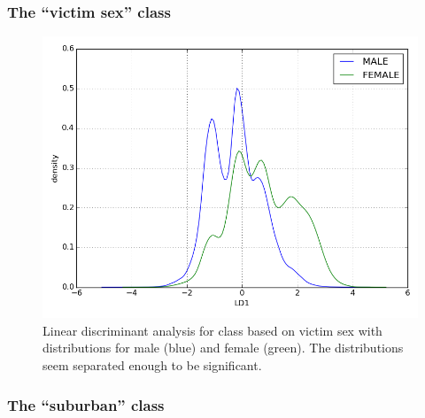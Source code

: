 \documentclass{evanarticle}
\begin{document}
\subsubsection{The ``victim sex'' class} \label{sec_victim_sex_class}

\begin{figure}[H]
  \centering
    \includegraphics[width=\linewidth]{images/vict_sex/vict_sex.png}
  \caption{Linear discriminant analysis for class based on victim sex with distributions for male (blue) and female (green).  The distributions seem separated enough to be significant.}
  \label{fig_vict_sex}
\end{figure}

\subsubsection{The ``suburban'' class}
\end{document}
